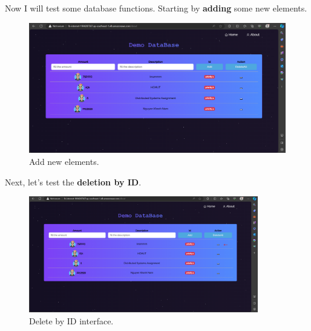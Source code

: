 \documentclass{article}
\begin{document}
Now I will test some database functions. Starting by \textbf{adding} some new elements.\par
\begin{figure}[h]
    \centering
    \includegraphics[width=12cm]{Pictures/Internet/Result_3.png}
    \caption{Add new elements.}
    \label{fig:enter-label}
\end{figure}

Next, let's test the \textbf{deletion by ID}.\par
\begin{figure}[h]
    \centering
    \includegraphics[width=10cm]{Pictures/Internet/Delete_1.png}
    \caption{Delete by ID interface.}
    \label{fig:enter-label}
\end{figure}
\end{document}
